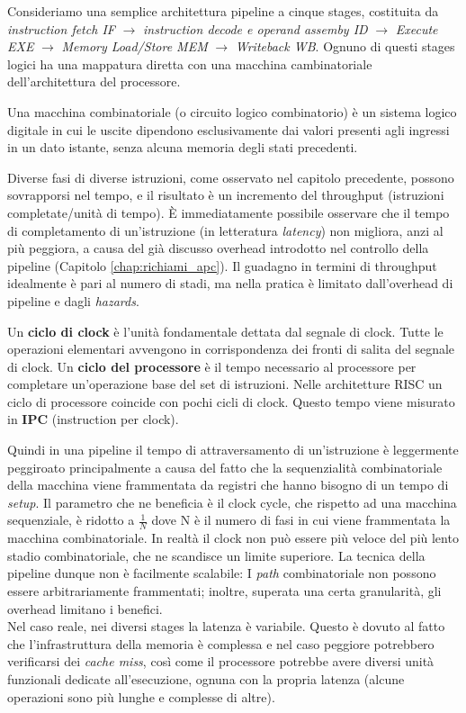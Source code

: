 Consideriamo una semplice architettura pipeline a cinque stages, costituita da \textit{instruction fetch IF} $\rightarrow$ \textit{instruction decode e operand assemby ID} $\rightarrow$ \textit{Execute EXE} $\rightarrow$ \textit{Memory Load/Store MEM} $\rightarrow$ \textit{Writeback WB}. Ognuno di questi stages logici ha una mappatura diretta con una macchina cambinatoriale dell'architettura del processore.

\begin{info}
Una macchina combinatoriale (o circuito logico combinatorio) è un sistema logico digitale in cui le uscite dipendono esclusivamente dai valori presenti agli ingressi in un dato istante, senza alcuna memoria degli stati precedenti.
\end{info}

\noindent Diverse fasi di diverse istruzioni, come osservato nel capitolo precedente, possono sovrapporsi nel tempo, e il risultato è un incremento del throughput (istruzioni completate/unità di tempo).
\uppercase{è} immediatamente possibile osservare che il tempo di completamento di un'istruzione (in letteratura \textit{latency}) non migliora, anzi al più peggiora, a causa del già discusso overhead introdotto nel controllo della pipeline (Capitolo \ref{chap:richiami_apc}). Il guadagno in termini di throughput idealmente è pari al numero di stadi, ma nella pratica è limitato dall'overhead di pipeline e dagli \textit{hazards}. 

\begin{warn}
Un \textbf{ciclo di clock} è l'unità fondamentale dettata dal segnale di clock. Tutte le operazioni elementari avvengono in corrispondenza dei fronti di salita del segnale di clock. Un \textbf{ciclo del processore} è il tempo necessario al processore per completare un'operazione base del set di istruzioni. Nelle architetture RISC un ciclo di processore coincide con pochi cicli di clock. Questo tempo viene misurato in \textbf{IPC} (instruction per clock).
\end{warn}

\noindent Quindi in una pipeline il tempo di attraversamento di un'istruzione è leggermente peggiroato principalmente a causa del fatto che la sequenzialità combinatoriale della macchina viene frammentata da registri che hanno bisogno di un tempo di \textit{setup}. Il parametro che ne beneficia è il clock cycle, che rispetto ad una macchina sequenziale, è ridotto a $\frac{1}{N}$ dove N è il numero di fasi in cui viene frammentata la macchina combinatoriale. In realtà il clock non può essere più veloce del più lento stadio combinatoriale, che ne scandisce un limite superiore. La tecnica della pipeline dunque non è facilmente scalabile: I \textit{path} combinatoriale non possono essere arbitrariamente frammentati; inoltre, superata una certa granularità, gli overhead limitano i benefici. \\ \noindent Nel caso reale, nei diversi stages la latenza è variabile. Questo è dovuto al fatto che l'infrastruttura della memoria è complessa e nel caso peggiore potrebbero verificarsi dei \textit{cache miss}, così come il processore potrebbe avere diversi unità funzionali dedicate all'esecuzione, ognuna con la propria latenza (alcune operazioni sono più lunghe e complesse di altre).

